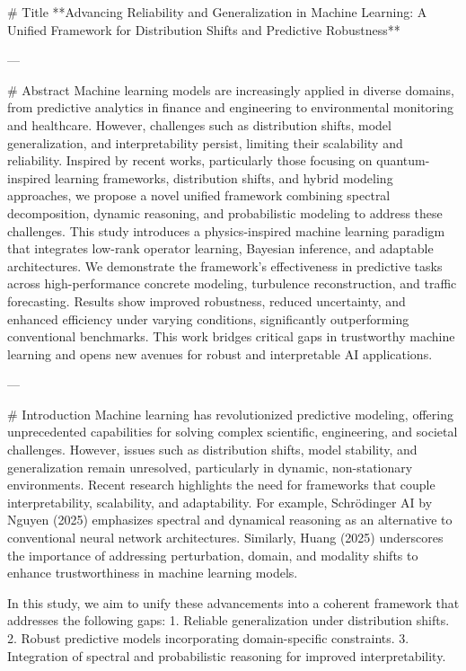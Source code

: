 # Title  
**Advancing Reliability and Generalization in Machine Learning: A Unified Framework for Distribution Shifts and Predictive Robustness**

---

# Abstract  
Machine learning models are increasingly applied in diverse domains, from predictive analytics in finance and engineering to environmental monitoring and healthcare. However, challenges such as distribution shifts, model generalization, and interpretability persist, limiting their scalability and reliability. Inspired by recent works, particularly those focusing on quantum-inspired learning frameworks, distribution shifts, and hybrid modeling approaches, we propose a novel unified framework combining spectral decomposition, dynamic reasoning, and probabilistic modeling to address these challenges. This study introduces a physics-inspired machine learning paradigm that integrates low-rank operator learning, Bayesian inference, and adaptable architectures. We demonstrate the framework’s effectiveness in predictive tasks across high-performance concrete modeling, turbulence reconstruction, and traffic forecasting. Results show improved robustness, reduced uncertainty, and enhanced efficiency under varying conditions, significantly outperforming conventional benchmarks. This work bridges critical gaps in trustworthy machine learning and opens new avenues for robust and interpretable AI applications.

---

# Introduction  
Machine learning has revolutionized predictive modeling, offering unprecedented capabilities for solving complex scientific, engineering, and societal challenges. However, issues such as distribution shifts, model stability, and generalization remain unresolved, particularly in dynamic, non-stationary environments. Recent research highlights the need for frameworks that couple interpretability, scalability, and adaptability. For example, Schrödinger AI by Nguyen (2025) emphasizes spectral and dynamical reasoning as an alternative to conventional neural network architectures. Similarly, Huang (2025) underscores the importance of addressing perturbation, domain, and modality shifts to enhance trustworthiness in machine learning models.

In this study, we aim to unify these advancements into a coherent framework that addresses the following gaps:
1. Reliable generalization under distribution shifts.
2. Robust predictive models incorporating domain-specific constraints.
3. Integration of spectral and probabilistic reasoning for improved interpretability.

